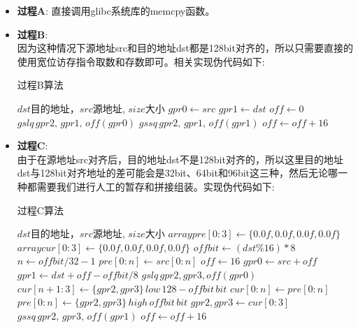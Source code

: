 \begin{itemize}

\item{\textbf{过程A}}: 直接调用glibc系统库的memcpy函数。
\item{\textbf{过程B}}: \\
因为这种情况下源地址src和目的地址dst都是128bit对齐的，所以只需要直接的使用宽位访存指令取数和存数即可。相关实现伪代码如下:
\vspace{6pt}
\begin{breakablealgorithm}
	\caption{过程B算法}
	\begin{algorithmic}[1] %
		\Require $dst$目的地址，$src$源地址, $size$大小
			\State $gpr0 \gets src$
			\State $gpr1 \gets dst$
			\State $off \gets 0$
				\State $gslq\, gpr2,\, gpr1,\, off(gpr0)$
				\State $gssq\, gpr2,\, gpr1,\, off(gpr1)$
				\State $off \gets off + 16$
			\EndWhile
		\EndFunction
	\end{algorithmic}
\end{breakablealgorithm}
\vspace{6pt}

\item{\textbf{过程C}}: \\
由于在源地址src对齐后，目的地址dst不是128bit对齐的，所以这里目的地址dst与128bit对齐地址的差可能会是32bit、64bit和96bit这三种，然后无论哪一种都需要我们进行人工的暂存和拼接组装。实现伪代码如下:
\vspace{6pt}
\begin{breakablealgorithm}
	\caption{过程C算法}
	\begin{algorithmic}[1] %
		\Require $dst$目的地址，$src$源地址, $size$大小
			\State $array pre[0:3] \gets \{0.0f, 0.0f, 0.0f, 0.0f\}$
			\State $array cur[0:3] \gets \{0.0f, 0.0f, 0.0f, 0.0f\}$
			\State $offbit \gets (dst \% 16) * 8$
			\State $n \gets offbit/32 - 1$
			\State $pre[0:n] \gets src[0:n]$
			\State $off \gets 16$
			\State $gpr0 \gets src + off$
			\State $gpr1 \gets dst + off - offbit/8$
				\State $gslq\, gpr2, gpr3, off(gpr0)$
				\State $cur[n+1:3]  \gets \{gpr2, gpr3\}\, low\, 128-offbit\, bit$
				\State $cur[0:n] \gets pre[0:n]$
				\State $pre[0:n] \gets \{gpr2, gpr3\}\, high\, offbit\, bit$
				\State ${gpr2, gpr3} \gets cur[0:3]$
				\State $gssq\, gpr2,\, gpr3,\, off(gpr1)$
				\State $off \gets off + 16$
			\EndWhile
		\EndFunction
	\end{algorithmic}
\end{breakablealgorithm}
\vspace{6pt}

\end{itemize}

